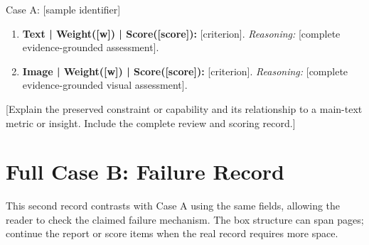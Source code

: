 \begin{ReportCaseBox}{Case A: [sample identifier]}
\begin{enumerate}
\item \textbf{Text | Weight([w]) | Score([score]):} [criterion]. \emph{Reasoning:} [complete evidence-grounded assessment].
\item \textbf{Image | Weight([w]) | Score([score]):} [criterion]. \emph{Reasoning:} [complete evidence-grounded visual assessment].
\end{enumerate}

[Explain the preserved constraint or capability and its relationship to a main-text metric or insight. Include the complete review and scoring record.]
\end{ReportCaseBox}

\FloatBarrier
{}
\section{Full Case B: Failure Record}
\label{app:case-b}

This second record contrasts with Case A using the same fields, allowing the reader to check the claimed failure mechanism. The box structure can span pages; continue the report or score items when the real record requires more space.

